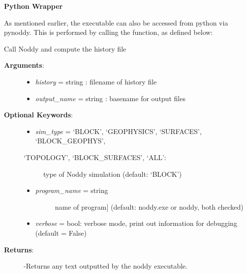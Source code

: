 \documentclass[a4paper,10pt,english]{sphinxmanual}
\begin{document}
\textbf{Python Wrapper}

As mentioned earlier, the executable can also be accessed from python via pynoddy.
This is performed by calling the  function, as defined below:

\begin{fulllineitems}
\label{noddy_module:pynoddy.compute_model}
Call Noddy and compute the history file
\begin{description}
\item[{\textbf{Arguments}:}] \leavevmode\begin{itemize}
\item {} 
\emph{history} = string : filename of history file

\item {} 
\emph{output\_name} = string : basename for output files

\end{itemize}

\item[{\textbf{Optional Keywords}:}] \leavevmode\begin{itemize}
\item {} 
\emph{sim\_type} = `BLOCK', `GEOPHYSICS', `SURFACES', `BLOCK\_GEOPHYS',

\end{itemize}
\begin{description}
\item[{`TOPOLOGY', `BLOCK\_SURFACES', `ALL':}] \leavevmode
type of Noddy simulation (default: `BLOCK')

\end{description}
\begin{itemize}
\item {} \begin{description}
\item[{\emph{program\_name} = string}] \leavevmode{[}name of program{]}
(default: noddy.exe or noddy, both checked)

\end{description}

\item {} 
\emph{verbose} = bool: verbose mode, print out information for debugging (default = False)

\end{itemize}

\item[{\textbf{Returns}:}] \leavevmode
-Returns any text outputted by the noddy executable.

\end{description}

\end{fulllineitems}
\end{document}
